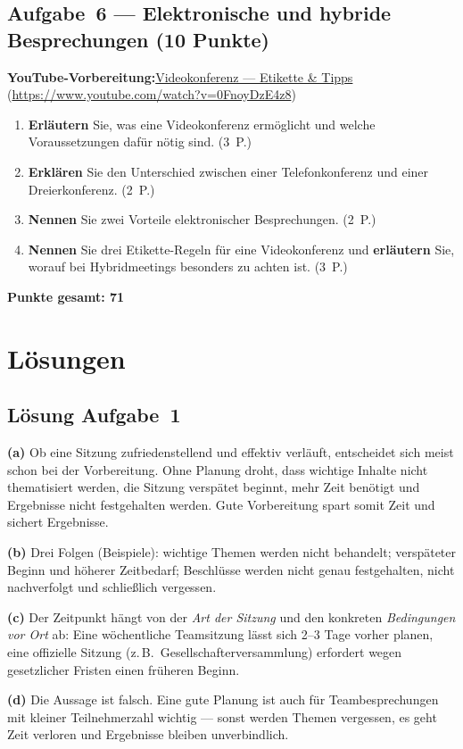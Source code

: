 \documentclass[11pt, a4paper]{article}
\begin{document}
\subsection*{Aufgabe~6 --- Elektronische und hybride Besprechungen (10 Punkte)}

\noindent\textbf{\color{bfwAccent}YouTube-Vorbereitung:}\enspace \href{https://www.youtube.com/watch?v=0FnoyDzE4z8}{Videokonferenz --- Etikette \& Tipps} (\url{https://www.youtube.com/watch?v=0FnoyDzE4z8})

\medskip
\begin{enumerate}[label=(\alph*)]
  \item \textbf{Erläutern} Sie, was eine Videokonferenz ermöglicht und welche Voraussetzungen dafür nötig sind. \hfill (3~P.)
  \item \textbf{Erklären} Sie den Unterschied zwischen einer Telefonkonferenz und einer Dreierkonferenz. \hfill (2~P.)
  \item \textbf{Nennen} Sie zwei Vorteile elektronischer Besprechungen. \hfill (2~P.)
  \item \textbf{Nennen} Sie drei Etikette-Regeln für eine Videokonferenz und \textbf{erläutern} Sie, worauf bei Hybridmeetings besonders zu achten ist. \hfill (3~P.)
\end{enumerate}

\vspace{1em}
\noindent\textbf{Punkte gesamt: 71}

\newpage

\section{Lösungen}\label{loesungen}

\subsection*{Lösung Aufgabe~1}
\begin{loesung}
\textbf{(a)} Ob eine Sitzung zufriedenstellend und effektiv verläuft, entscheidet sich
meist schon bei der Vorbereitung. Ohne Planung droht, dass wichtige Inhalte nicht
thematisiert werden, die Sitzung verspätet beginnt, mehr Zeit benötigt und Ergebnisse
nicht festgehalten werden. Gute Vorbereitung spart somit Zeit und sichert Ergebnisse.

\textbf{(b)} Drei Folgen (Beispiele): wichtige Themen werden nicht behandelt; verspäteter
Beginn und höherer Zeitbedarf; Beschlüsse werden nicht genau festgehalten, nicht
nachverfolgt und schließlich vergessen.

\textbf{(c)} Der Zeitpunkt hängt von der \emph{Art der Sitzung} und den konkreten
\emph{Bedingungen vor Ort} ab: Eine wöchentliche Teamsitzung lässt sich 2--3 Tage vorher
planen, eine offizielle Sitzung (z.\,B.\ Gesellschafterversammlung) erfordert wegen
gesetzlicher Fristen einen früheren Beginn.

\textbf{(d)} Die Aussage ist falsch. Eine gute Planung ist auch für Teambesprechungen mit
kleiner Teilnehmerzahl wichtig --- sonst werden Themen vergessen, es geht Zeit verloren und
Ergebnisse bleiben unverbindlich.
\end{loesung}
\end{document}

